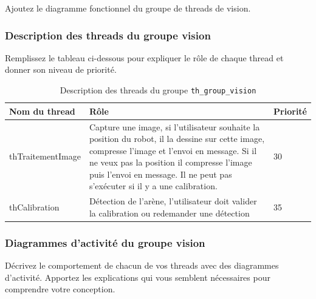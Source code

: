 \documentclass[11pt, a4paper]{paper}
\begin{document}
{\color{blue} Ajoutez le diagramme fonctionnel du groupe de threads de vision.}

\subsubsection{Description des threads du groupe vision}
{\color{red} Remplissez le tableau ci-dessous pour expliquer le rôle de chaque thread et donner son niveau de priorité.}


\begin{table}[htp]
\caption{Description des threads du groupe {\tt th\_group\_vision}}
\begin{center}
\begin{tabular}{|p{3cm}|p{8.5cm}|p{2cm}|}
\hline
\bf Nom du thread &	\bf Rôle &	\bf Priorité \\
\hline
\hline
\color{black}thTraitementImage &	\color{black}Capture une image, si l'utilisateur souhaite la position du robot, il la dessine sur cette image, compresse l'image et l'envoi en message. Si il ne veux pas la position il compresse l'image puis l'envoi en message. Il ne peut pas s'exécuter si il y a une calibration. &	\color{blue}30\\
\hline
\color{black}thCalibration &	\color{black}Détection de l'arène, l'utilisateur doit valider la calibration ou redemander une détection &	\color{blue}35\\
\hline
\end{tabular}
\end{center}
\label{tab:gt_moniteur}
\end{table}%
\FloatBarrier

\subsubsection{Diagrammes d'activité du groupe vision}
{\color{blue}Décrivez le comportement de chacun de vos threads avec des diagrammes d'activité. Apportez les explications qui vous semblent nécessaires pour comprendre votre conception.}
\end{document}
